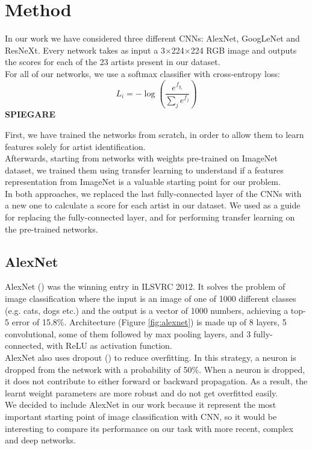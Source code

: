 \documentclass{article}
\begin{document}
\section{Method}\label{method}
In our work we have considered three different CNNs: AlexNet, GoogLeNet and ResNeXt. Every network takes as input a
3$\times$224$\times$224 RGB image and outputs the scores for each of the 23 artists present in our dataset.
\\
For all of our networks, we use a softmax classifier with
cross-entropy loss:
\begin{equation}
L_{i}=-\log \left(\frac{e^{f_{y_{i}}}}{\sum_{j} e^{f_{j}}}\right)
\end{equation}
\textbf{SPIEGARE}

First, we have trained the networks from scratch, in order to allow them to learn features solely for artist identification. \\
Afterwards, starting from networks with weights pre-trained on ImageNet dataset, we trained them using transfer learning to understand if a features representation from ImageNet is a valuable starting point for our problem.\\
In both approaches, we replaced the last fully-connected layer of the CNNs with a new one to calculate a score for each artist in
our dataset. We used \cite{pytorchguide} as a guide for replacing the fully-connected layer, and for performing transfer learning on the pre-trained networks.

\subsection{AlexNet}
AlexNet (\cite{alexnet}) was the winning entry in ILSVRC 2012. It solves the problem of image classification where the input is an image of one of 1000 different classes (e.g. cats, dogs etc.) and the output is a vector of 1000 numbers, achieving a top-5 error of 15.8\%.
Architecture (Figure \ref{fig:alexnet}) is made up of 8 layers, 5 convolutional, some of them followed by max pooling layers, and 3 fully-connected, with ReLU as activation function.\\
AlexNet also uses dropout (\cite{dropout}) to reduce overfitting. In this strategy, a neuron is dropped from the network with a probability of 50\%. When a neuron is dropped, it does not contribute to either forward or backward propagation. 
As a result, the learnt weight parameters are more robust and do not get overfitted easily.\\
We decided to include AlexNet in our work because it represent the most important starting point of image classification with CNN, so it would be interesting to compare its performance on our task with more recent, complex and deep networks.
\end{document}
